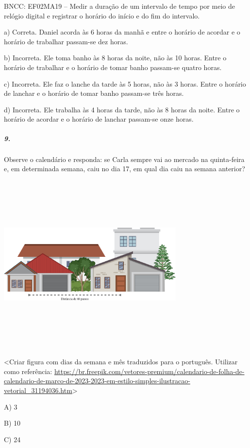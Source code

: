 BNCC: EF02MA19 -- Medir a duração de um intervalo de tempo por meio de
relógio digital e registrar o horário do início e do fim do intervalo.

a) Correta. Daniel acorda às 6 horas da manhã e entre o horário de acordar e o horário de trabalhar passam-se dez horas.

b) Incorreta. Ele toma banho às 8 horas da noite, não às 10 horas. Entre o horário de trabalhar e o horário de tomar banho passam-se quatro horas.

c) Incorreta. Ele faz o lanche da tarde às 5 horas, não às 3 horas. Entre o horário de lanchar e o horário de tomar banho passam-se três horas.

d) Incorreta. Ele trabalha às 4 horas da tarde, não às 8 horas da noite. Entre o horário de acordar e o horário de lanchar passam-se onze horas.

\subparagraph{9. }\label{section-108}

Observe o calendário e responda: se Carla sempre vai ao mercado na
quinta-feira e, em determinada semana, caiu no dia 17, em qual dia caiu na semana anterior?

\includegraphics[width=3.68590in,height=3.59375in]{media/image117.png}

\textless{}Criar figura com dias da semana e mês traduzidos para o
português. Utilizar como referência:
\url{https://br.freepik.com/vetores-premium/calendario-de-folha-de-calendario-de-marco-de-2023-2023-em-estilo-simples-ilustracao-vetorial_31194036.htm}\textgreater{}

A) 3

B) 10

C) 24


